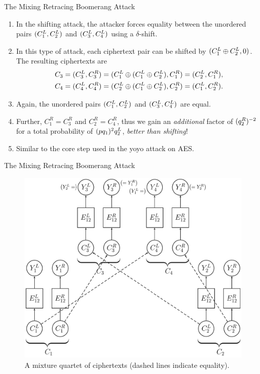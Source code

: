 \documentclass[notheorems]{beamer}
\theoremstyle{definition}
\theoremstyle{example}
\begin{document}
    \begin{frame}[<+->]{The Mixing Retracing Boomerang Attack}
        \begin{enumerate}
            \item In the shifting attack, the attacker forces equality between
            the unordered pairs \((C_1^L, C_2^L)\) and \((C_3^L,
            C_4^L)\) using a \(\delta\)-shift.
            \item In this type of attack, each ciphertext pair can be shifted by
            \((C_1^L \oplus C_2^L, 0)\). The resulting ciphertexts are
            \begin{align}
                C_3 &= (C_3^L, C_3^R) = (C_1^L \oplus (C_1^L \oplus C_2^L), C_1^R) = (C_2^L, C_1^R), \\
                C_4 &= (C_4^L, C_4^R) = (C_2^L \oplus (C_1^L \oplus C_2^L), C_2^R) = (C_1^L, C_2^R).
            \end{align}
            \item Again, the unordered pairs \((C_1^L, C_2^L)\) and
            \((C_3^L, C_4^L)\) are equal.
            \item Further, \(C_1^R = C_3^R\) and \(C_2^R = C_4^R\), thus we gain
            an \emph{additional} factor of \((q_2^R)^{-2}\) for a total
            probability of \((pq_1)^2q_2^L\), \emph{better than shifting}!
            \item Similar to the core step used in the yoyo attack on AES.
        \end{enumerate}
    \end{frame}

    \begin{frame}{The Mixing Retracing Boomerang Attack}
        \begin{figure}
            \centering
            \includegraphics[width=0.55\columnwidth]{images/mixing_boomerang.png}
            \caption{A mixture quartet of ciphertexts (dashed lines indicate equality).}
        \end{figure}
    \end{frame}
\end{document}
